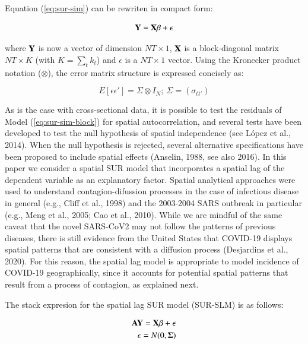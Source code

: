 \documentclass[]{elsarticle} %
\begin{document}
Equation (\ref{eq:sur-sim}) can be rewriten in compact form:

\begin{equation}
\bf{Y} = \bf{X} \beta + \epsilon
\label{eq:sur-sim-block}
\end{equation}

where \(\bf{Y}\) is now a vector of dimension \(NT \times 1\),
\(\bf{X}\) is a block-diagonal matrix \(NT \times K\) (with
\(K = \sum_t{k_t}\)) and \(\epsilon\) is a \(NT \times 1\) vector. Using
the Kronecker product notation (\(\otimes\)), the error matrix structure
is expressed concisely as:

\begin{equation}
E[\epsilon \epsilon']=\Sigma \otimes I_N ; \ \Sigma=(\sigma_{tt'})
\end{equation}

As is the case with cross-sectional data, it is possible to test the
residuals of Model (\ref{eq:sur-sim-block}) for spatial autocorrelation,
and several tests have been developed to test the null hypothesis of
spatial independence (see López et al., 2014). When the null hypothesis
is rejected, several alternative specifications have been proposed to
include spatial effects (Anselin, 1988, see also 2016). In this paper we
consider a spatial SUR model that incorporates a spatial lag of the
dependent variable as an explanatory factor. Spatial analytical
approaches were used to understand contagion-difussion processes in the
case of infectious disease in general (e.g., Cliff et al., 1998) and the
2003-2004 SARS outbreak in particular (e.g., Meng et al., 2005; Cao et
al., 2010). While we are mindful of the same caveat that the novel
SARS-CoV2 may not follow the patterns of previous diseases, there is
still evidence from the United States that COVID-19 displays spatial
patterns that are consistent with a diffusion process (Desjardins et
al., 2020). For this reason, the spatial lag model is appropriate to
model incidence of COVID-19 geographically, since it accounts for
potential spatial patterns that result from a process of contagion, as
explained next.

The stack expresion for the spatial lag SUR model (SUR-SLM) is as
follows:

\begin{equation}
\label{eq:sur-slm}
\begin{aligned}
\bf{AY} = \bf{X} \beta + \epsilon \\
\epsilon =N(0,\bf{\Sigma})
\end{aligned}
\end{equation}
\end{document}
